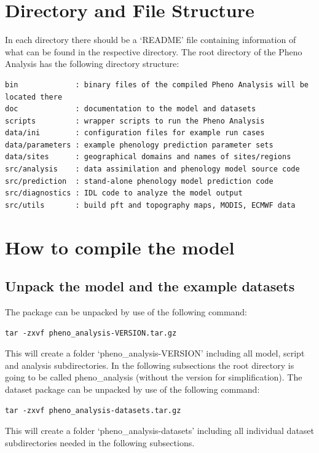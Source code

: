 \documentclass[a4paper,12pt]{article}
\begin{document}
\section{Directory and File Structure}
In each directory there should be a `README' file containing information of what can be found in the respective directory. The root directory of the Pheno Analysis has the following directory structure:
\begin{verbatim}
bin             : binary files of the compiled Pheno Analysis will be located there
doc             : documentation to the model and datasets
scripts         : wrapper scripts to run the Pheno Analysis
data/ini        : configuration files for example run cases
data/parameters : example phenology prediction parameter sets
data/sites      : geographical domains and names of sites/regions 
src/analysis    : data assimilation and phenology model source code
src/prediction  : stand-alone phenology model prediction code
src/diagnostics : IDL code to analyze the model output
src/utils       : build pft and topography maps, MODIS, ECMWF data
\end{verbatim}

\section{How to compile the model}

\subsection{Unpack the model and the example datasets}
The package can be unpacked by use of the following command:
\begin{verbatim}
tar -zxvf pheno_analysis-VERSION.tar.gz
\end{verbatim}
This will create a folder `pheno\_analysis-VERSION' including all model, script and analysis subdirectories. In the following subsections the root directory is going to be called pheno\_analysis (without the version for simplification). The dataset package can be unpacked by use of the following command:
\begin{verbatim}
tar -zxvf pheno_analysis-datasets.tar.gz
\end{verbatim}
This will create a folder `pheno\_analysis-datasets' including all individual dataset subdirectories needed in the following subsections.
\end{document}
